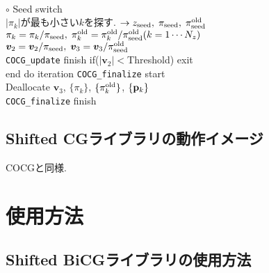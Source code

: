\documentclass[12pt,titlepage]{jarticle}
\renewenvironment{leftbar}{%
  \def\FrameCommand{\vrule width 1pt \hspace{0pt}}%
  \MakeFramed {\advance\hsize-\width \FrameRestore}}%
 {\endMakeFramed}
\begin{document}
\begin{leftbar}
  \\\hspace{1.0cm}
  $\circ$ Seed switch
  \\\hspace{1.0cm}
  $|\pi_k|$が最も小さい$k$を探す. $\rightarrow z_{\rm seed},\; \pi_{\rm seed},\; \pi_{\rm seed}^{\rm old} $
  \\\hspace{1.0cm}
  $\pi_k = \pi_k /\pi_{\rm seed},\; \pi_k^{\rm old} = \pi_k^{\rm old} / \pi_{\rm seed}^{\rm old} (k=1 \cdots N_z)$
  \\\hspace{1.0cm}
  ${\boldsymbol v}_2 = {\boldsymbol v}_2 / \pi_{\rm seed},\; {\boldsymbol v}_3 = {\boldsymbol v}_3 / \pi_{\rm seed}^{\rm old}$
  \\\hspace{0.5cm}
  \verb|COCG_update| finish
\end{leftbar}
\vspace{-1em}
\noindent
\hspace{0.5cm}
if($|{\boldsymbol v}_2| < $Threshold) exit
\\
end do iteration
\vspace{-1em}
\begin{leftbar}
  \noindent
  \verb|COCG_finalize| start
  \\ \hspace{0.5cm}
  Deallocate ${\boldsymbol v}_3$, $\{\pi_k\}$, $\{\pi_k^{\rm old}\}$, $\{{\bf p}_k\}$
  \\
  \verb|COCG_finalize| finish
\end{leftbar}
\vspace{-1em}

\subsection{Shifted CGライブラリの動作イメージ}

COCGと同様.

\section{使用方法}

\subsection{Shifted BiCGライブラリの使用方法}
\end{document}

